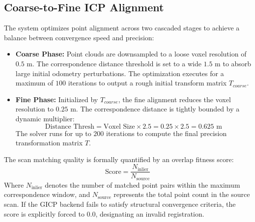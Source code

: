 \documentclass{article}
\begin{document}
\subsection{Coarse-to-Fine ICP Alignment}
The system optimizes point alignment across two cascaded stages to achieve a balance between convergence speed and precision:
\begin{itemize}
    \item \textbf{Coarse Phase:} Point clouds are downsampled to a loose voxel resolution of $0.5\text{ m}$. The correspondence distance threshold is set to a wide $1.5\text{ m}$ to absorb large initial odometry perturbations. The optimization executes for a maximum of $100$ iterations to output a rough initial transform matrix $T_{coarse}$.
    \item \textbf{Fine Phase:} Initialized by $T_{coarse}$, the fine alignment reduces the voxel resolution to $0.25\text{ m}$. The correspondence distance is tightly bounded by a dynamic multiplier:
    \begin{equation}
        \text{Distance Thresh} = \text{Voxel Size} \times 2.5 = 0.25 \times 2.5 = 0.625\text{ m}
    \end{equation}
    The solver runs for up to $200$ iterations to compute the final precision transformation matrix $T$.
\end{itemize}
The scan matching quality is formally quantified by an overlap fitness score:
\begin{equation}
    \text{Score} = \frac{N_{\text{inlier}}}{N_{\text{source}}}
\end{equation}
Where $N_{\text{inlier}}$ denotes the number of matched point pairs within the maximum correspondence window, and $N_{\text{source}}$ represents the total point count in the source scan. If the GICP backend fails to satisfy structural convergence criteria, the score is explicitly forced to $0.0$, designating an invalid registration.
\end{document}
